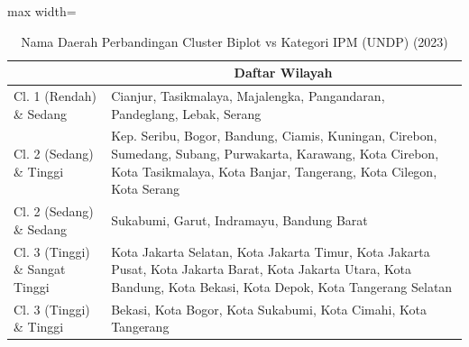 \begin{table}[H]
\centering
\caption{Nama Daerah Perbandingan Cluster Biplot vs Kategori IPM (UNDP) (2023)} \label{tab:app1crossname2023}
\begin{adjustbox}{max width=\textwidth}
\begin{tabular}{|>{\centering\arraybackslash}p{4cm}|p{10cm}|}
\hline
\multicolumn{1}{|c|}{\textbf{Kategori}} & \multicolumn{1}{c|}{\textbf{Daftar Wilayah}} \\
\hline
Cl. 1 (Rendah) \& Sedang & Cianjur, Tasikmalaya, Majalengka, Pangandaran, Pandeglang, Lebak, Serang \\
\hline
Cl. 2 (Sedang) \& Tinggi & Kep. Seribu, Bogor, Bandung, Ciamis, Kuningan, Cirebon, Sumedang, Subang, Purwakarta, Karawang, Kota Cirebon, Kota Tasikmalaya, Kota Banjar, Tangerang, Kota Cilegon, Kota Serang \\
\hline
Cl. 2 (Sedang) \& Sedang & Sukabumi, Garut, Indramayu, Bandung Barat \\
\hline
Cl. 3 (Tinggi) \& Sangat Tinggi & Kota Jakarta Selatan, Kota Jakarta Timur, Kota Jakarta Pusat, Kota Jakarta Barat, Kota Jakarta Utara, Kota Bandung, Kota Bekasi, Kota Depok, Kota Tangerang Selatan \\
\hline
Cl. 3 (Tinggi) \& Tinggi & Bekasi, Kota Bogor, Kota Sukabumi, Kota Cimahi, Kota Tangerang \\
\hline
\end{tabular}
\end{adjustbox}
\end{table}